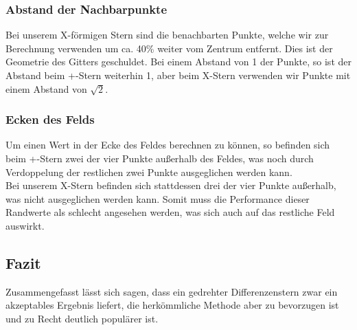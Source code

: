 \documentclass[twoside,10pt,a4paper]{article}
\numberwithin{equation}{section}					%
\numberwithin{figure}{section}						%
\begin{document}
\subsubsection{Abstand der Nachbarpunkte}
Bei unserem X-förmigen Stern sind die benachbarten Punkte, welche wir zur Berechnung verwenden um ca. 40\% weiter vom Zentrum entfernt. Dies ist der Geometrie des Gitters geschuldet. Bei einem Abstand von 1 der Punkte, so ist der Abstand beim +-Stern weiterhin 1, aber beim X-Stern verwenden wir Punkte mit einem Abstand von $\sqrt{2}$.
\subsubsection{Ecken des Felds}
Um einen Wert in der Ecke des Feldes berechnen zu können, so befinden sich beim +-Stern zwei der vier Punkte außerhalb des Feldes, was noch durch Verdoppelung der restlichen zwei Punkte ausgeglichen werden kann.\\
Bei unserem X-Stern befinden sich stattdessen drei der vier Punkte außerhalb, was nicht ausgeglichen werden kann. Somit muss die Performance dieser Randwerte als schlecht angesehen werden, was sich auch auf das restliche Feld auswirkt.
\subsection{Fazit}
Zusammengefasst lässt sich sagen, dass ein gedrehter Differenzenstern zwar ein akzeptables Ergebnis liefert, die herkömmliche Methode aber zu bevorzugen ist und zu Recht deutlich populärer ist.
\end{document}
